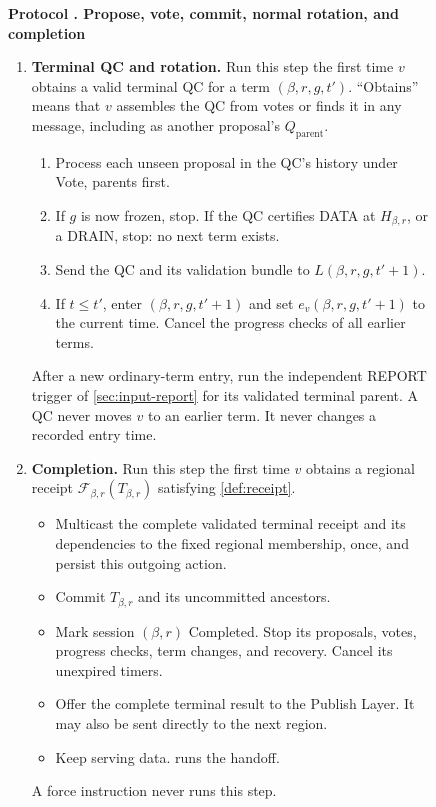 \documentclass[11pt,a4paper]{article}
\newcommand{\RR}[1]{{\color{rrRed}#1}}
\newcommand{\FC}{\mathcal F}
\newcounter{protocol}
\newenvironment{protocol}[3][htbp]{\begin{figure}[#1]\refstepcounter{protocol}\label{#2}
\begin{mdframed}[linewidth=.6pt,skipabove=0pt,skipbelow=0pt,
innertopmargin=7pt,innerbottommargin=7pt]\small
\textbf{Protocol \theprotocol. #3}\par\smallskip}{\end{mdframed}\end{figure}}
\begin{document}
\begin{protocol}{alg:steady}{Propose, vote, commit, normal rotation\RR{, and completion}}
\begin{enumerate}[label=\textbf{\arabic*)},itemsep=3pt]
\item \textbf{Terminal QC and rotation.} Run this step the first time
$v$ obtains a valid terminal QC for a term $(\beta,r,g,t')$.
``Obtains'' means that $v$ assembles the QC from votes or finds it in
any message, including as another proposal's $Q_{\mathrm{parent}}$.
 \begin{enumerate}[label=(\alph*)]
 \item Process each unseen proposal in the QC's history under Vote,
       parents first.
 \item If $g$ is now frozen, stop. \RR{If the QC certifies DATA at
       $H_{\beta,r}$, or a DRAIN, stop: no next term exists.}
 \item Send the QC and its validation bundle to $L(\beta,r,g,t'+1)$.
 \item If $t\le t'$, enter $(\beta,r,g,t'+1)$ and set $e_v(\beta,r,g,t'+1)$ to the
       current time. Cancel the progress checks of all earlier
       terms.
 \end{enumerate}
 After a new ordinary-term entry, run the independent REPORT trigger
 of \cref{sec:input-report} for its validated terminal parent.
 A QC never moves $v$ to an earlier term. It never changes a recorded
 entry time.

\item \RR{\textbf{Completion.} Run this step the first time $v$ obtains a
regional receipt $\FC_{\beta,r}(T_{\beta,r})$ satisfying \cref{def:receipt}.}
 \begin{itemize}\color{rrRed}
 \item Multicast the complete validated terminal receipt and its dependencies
       to the fixed regional membership, once, and persist this outgoing action.
 \item Commit $T_{\beta,r}$ and its uncommitted ancestors.
 \item Mark session $(\beta,r)$ Completed. Stop its proposals, votes, progress
       checks, term changes, and recovery. Cancel its unexpired timers.
 \item Offer the complete terminal result to the Publish Layer.
       It may also be sent directly to the next region.
 \item Keep serving data.  runs the handoff.
 \end{itemize}
 \RR{A force instruction never runs this step.}
\end{enumerate}
\end{protocol}
\end{document}
